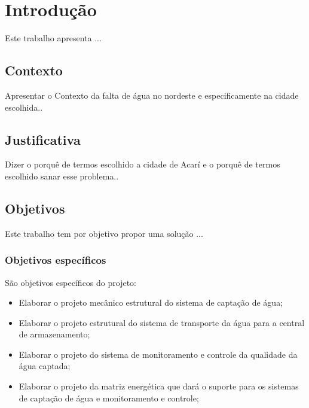 
\chapter{Introdução}

Este trabalho apresenta ...

\section{Contexto}

Apresentar o Contexto da falta de água no nordeste e especificamente na cidade escolhida..

\section{Justificativa}

Dizer o porquê de termos escolhido a cidade de Acarí e o porquê de termos escolhido sanar esse problema..

\section{Objetivos}

Este trabalho tem por objetivo propor uma solução ...

 \subsection{Objetivos específicos}
 
 São objetivos específicos do projeto:
 
 \begin{itemize}
  \item Elaborar o projeto mecânico estrutural do sistema de captação de água;
  \item Elaborar o projeto estrutural do sistema de transporte da água para a central de armazenamento;
  \item Elaborar o projeto do sistema de monitoramento e controle da qualidade da água captada;
  \item Elaborar o projeto da matriz energética que dará o suporte para os sistemas de captação de água e monitoramento e controle;
 \end{itemize}

